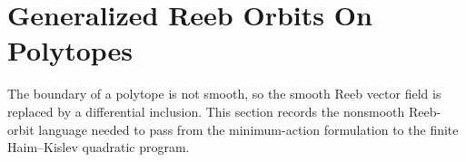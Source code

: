\section{Generalized Reeb Orbits On Polytopes}\label{sec:generalized-reeb-orbits-polytopes}

The boundary of a polytope is not smooth, so the smooth Reeb vector field is
replaced by a differential inclusion. This section records the nonsmooth
Reeb-orbit language needed to pass from the minimum-action formulation to the
finite Haim--Kislev quadratic program.




